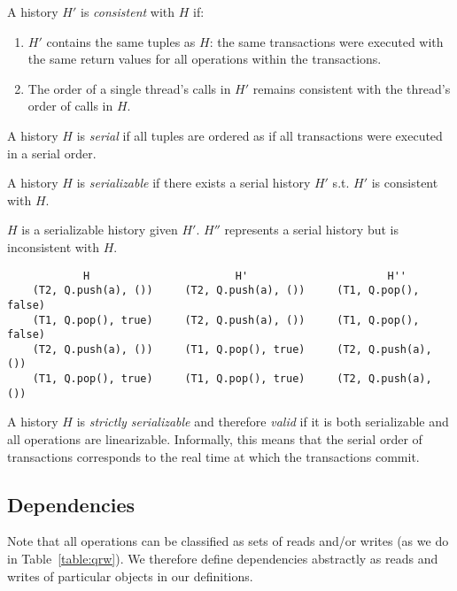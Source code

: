 \begin{defn}
    A history $H'$ is \emph{consistent} with $H$ if:
    \begin{enumerate}
        \item $H'$ contains the same tuples as $H$: the same transactions were executed with the same return values for all operations within the transactions.
        \item The order of a single thread's calls in $H'$ remains consistent with the thread's order of calls in $H$.
    \end{enumerate}
\end{defn}

\begin{defn}
    A history $H$ is \emph{serial} if all tuples are ordered as if all transactions were executed in a serial order.
\end{defn}
\begin{defn}
    A history $H$ is \emph{serializable} if there exists a serial history $H'$ s.t. $H'$ is consistent with $H$.

\end{defn}

\begin{eg}
$H$ is a serializable history given $H'$. $H''$ represents a serial history but is inconsistent with $H$.
\begin{lstlisting}
            H                       H'                      H'' 
    (T2, Q.push(a), ())     (T2, Q.push(a), ())     (T1, Q.pop(), false)
    (T1, Q.pop(), true)     (T2, Q.push(a), ())     (T1, Q.pop(), false)
    (T2, Q.push(a), ())     (T1, Q.pop(), true)     (T2, Q.push(a), ())
    (T1, Q.pop(), true)     (T1, Q.pop(), true)     (T2, Q.push(a), ()) 
\end{lstlisting}
\end{eg}

\begin{defn}
    A history $H$ is \emph{strictly serializable} and therefore \emph{valid} if it is both serializable and all operations are linearizable. Informally, this means that the serial order of transactions corresponds to the real time at which the transactions commit.
\end{defn}

\subsection{Dependencies}

Note that all operations can be classified as sets of reads and/or writes (as we do in Table~\ref{table:qrw}). We therefore define dependencies abstractly as reads and writes of particular objects in our definitions.

